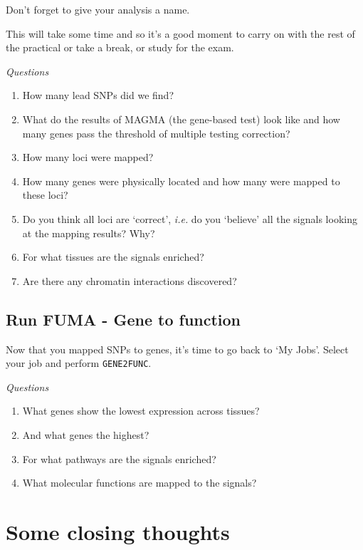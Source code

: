 \documentclass[
]{book}
\newcommand{\passthrough}[1]{#1}
\providecommand{\tightlist}{%
  \setlength{\itemsep}{0pt}\setlength{\parskip}{0pt}}
\begin{document}
Don't forget to give your analysis a name.

This will take some time and so it's a good moment to carry on with the rest of the practical or take a break, or study for the exam.

\emph{Questions}

\begin{enumerate}
\def\labelenumi{\arabic{enumi}.}
\tightlist
\item
  How many lead SNPs did we find?
\item
  What do the results of MAGMA (the gene-based test) look like and how many genes pass the threshold of multiple testing correction?
\item
  How many loci were mapped?
\item
  How many genes were physically located and how many were mapped to these loci?
\item
  Do you think all loci are `correct', \emph{i.e.} do you `believe' all the signals looking at the mapping results? Why?
\item
  For what tissues are the signals enriched?
\item
  Are there any chromatin interactions discovered?
\end{enumerate}

\hypertarget{run-fuma---gene-to-function}{%
\subsection{Run FUMA - Gene to function}\label{run-fuma---gene-to-function}}

Now that you mapped SNPs to genes, it's time to go back to `My Jobs'. Select your job and perform \passthrough{\lstinline!GENE2FUNC!}.

\emph{Questions}

\begin{enumerate}
\def\labelenumi{\arabic{enumi}.}
\tightlist
\item
  What genes show the lowest expression across tissues?
\item
  And what genes the highest?
\item
  For what pathways are the signals enriched?
\item
  What molecular functions are mapped to the signals?
\end{enumerate}

\hypertarget{some-closing-thoughts}{%
\section{Some closing thoughts}\label{some-closing-thoughts}}
\end{document}
